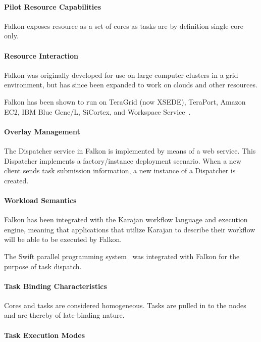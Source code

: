 \documentclass{sig-alternate}
\begin{document}
\paragraph{Pilot Resource Capabilities}

Falkon exposes resource as a set of cores as tasks are by definition single
core only.

\paragraph{Resource Interaction}

Falkon was originally developed for use on large computer clusters in a grid
environment, but has since been expanded to work on clouds and other resources.

Falkon has been shown to run on TeraGrid (now XSEDE), TeraPort, Amazon EC2, IBM
Blue Gene/L, SiCortex, and Workspace Service~\cite{1362680}.

\paragraph{Overlay Management}

The Dispatcher service in Falkon is implemented by means of a web service.
This Dispatcher implements a factory/instance deployment scenario.
When a new client sends task submission information, a new instance
of a Dispatcher is created.

\paragraph{Workload Semantics}

Falkon has been integrated with the Karajan workflow language and execution
engine, meaning that applications that utilize Karajan to describe their
workflow will be able to be executed by Falkon.

The Swift parallel programming system~\cite{Wilde2011} was integrated
with Falkon for the purpose of task dispatch.

\paragraph{Task Binding Characteristics}

Cores and tasks are considered homogeneous. Tasks are pulled in to the nodes
and are thereby of late-binding nature.

\paragraph{Task Execution Modes}
\end{document}
